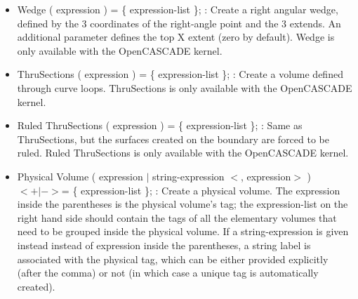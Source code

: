 \documentclass[dvipdfmx, 9pt, a4paper]{article}
\numberwithin{equation}{section}
\begin{document}
\begin{itemize}
\item Wedge ( expression ) = \{ expression-list \}; : Create a right angular wedge, defined by the 3 coordinates of the right-angle point
and the 3 extends. An additional parameter defines the top X extent (zero by default). Wedge is only available with the OpenCASCADE kernel.
\item ThruSections ( expression ) = \{ expression-list \}; : Create a volume defined through curve loops. ThruSections is only available with
the OpenCASCADE kernel.
\item Ruled ThruSections ( expression ) = \{ expression-list \}; : Same as ThruSections, but the surfaces created on the boundary are forced to be ruled. Ruled ThruSections is only available with the OpenCASCADE kernel.
\item Physical Volume ( expression $|$ string-expression $<$, expression$>$ ) $<+|->$= \{ expression-list \}; : Create a physical volume. The expression inside the parentheses is the physical volume's tag; the expression-list on the right hand side should contain the tags of all the elementary volumes that need to be grouped inside the physical volume. If a string-expression is given instead instead of expression inside the parentheses, a string label is associated with the physical tag, which can be either provided explicitly (after the comma) or not (in which case a unique tag is automatically created).
\end{itemize}
\end{document}
